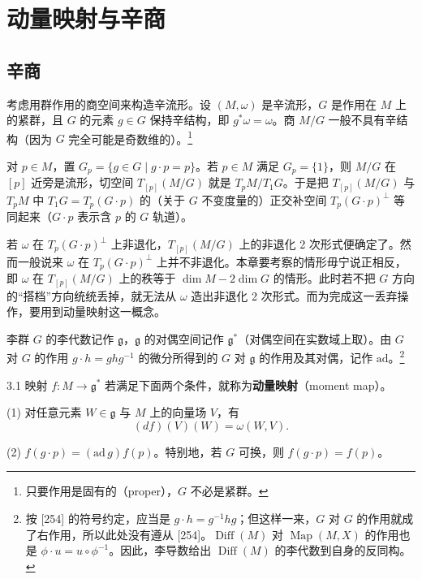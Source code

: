 \chapter{动量映射与辛商}

\section{辛商}


考虑用群作用的商空间来构造辛流形。设 $(M,\omega)$ 是辛流形，$G$ 是作用在 $M$ 上的紧群，且 $G$ 的元素 $g\in G$ 保持辛结构，即 $g^*\omega=\omega$。商 $M/G$ 一般不具有辛结构（因为 $G$ 完全可能是奇数维的）。\footnote{只要作用是固有的（proper），$G$ 不必是紧群。}

对 $p\in M$，置 $G_p=\{g\in G\mid g\cdot p=p\}$。若 $p\in M$ 满足 $G_p=\{1\}$，则 $M/G$ 在 $[p]$ 近旁是流形，切空间 $T_{[p]}(M/G)$ 就是 $T_pM/T_1G$。于是把 $T_{[p]}(M/G)$ 与 $T_pM$ 中 $T_1G=T_p(G\cdot p)$ 的（关于 $G$ 不变度量的）正交补空间 $T_p(G\cdot p)^{\perp}$ 等同起来（$G\cdot p$ 表示含 $p$ 的 $G$ 轨道）。

若 $\omega$ 在 $T_p(G\cdot p)^{\perp}$ 上非退化，$T_{[p]}(M/G)$ 上的非退化 2 次形式便确定了。然而一般说来 $\omega$ 在 $T_p(G\cdot p)^{\perp}$ 上并不非退化。本章要考察的情形毋宁说正相反，即 $\omega$ 在 $T_{[p]}(M/G)$ 上的秩等于 $\dim M-2\dim G$ 的情形。此时若不把 $G$ 方向的“搭档”方向统统丢掉，就无法从 $\omega$ 造出非退化 2 次形式。而为完成这一丢弃操作，要用到动量映射这一概念。

李群 $G$ 的李代数记作 $\mathfrak{g}$，$\mathfrak{g}$ 的对偶空间记作 $\mathfrak{g}^*$（对偶空间在实数域上取）。由 $G$ 对 $G$ 的作用 $g\cdot h=ghg^{-1}$ 的微分所得到的 $G$ 对 $\mathfrak{g}$ 的作用及其对偶，记作 $\mathrm{ad}$。\footnote{按 [254] 的符号约定，应当是 $g\cdot h=g^{-1}hg$；但这样一来，$G$ 对 $G$ 的作用就成了右作用，所以此处没有遵从 [254]。$\operatorname{Diff}(M)$ 对 $\operatorname{Map}(M,X)$ 的作用也是 $\phi\cdot u=u\circ\phi^{-1}$。因此，李导数给出 $\operatorname{Diff}(M)$ 的李代数到自身的反同构。}

\begin{definition}{3.1}
  映射 $f\colon M\to\mathfrak{g}^*$ 若满足下面两个条件，就称为\textbf{动量映射}（moment map）。

  (1) 对任意元素 $W\in\mathfrak{g}$ 与 $M$ 上的向量场 $V$，有
  \[
    (df)(V)(W)=\omega(W,V).
  \]

  (2) $f(g\cdot p)=(\mathrm{ad}\,g)f(p)$。特别地，若 $G$ 可换，则 $f(g\cdot p)=f(p)$。
\end{definition}

